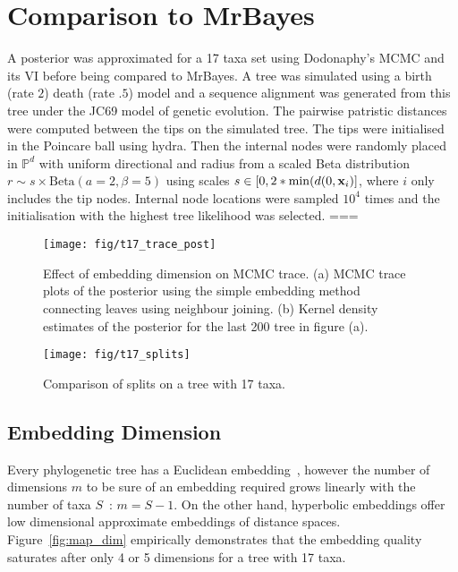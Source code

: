 \documentclass[11pt, twocolumn]{article}
\begin{document}
\section{Comparison to MrBayes}
A posterior was approximated for a 17 taxa set using Dodonaphy's MCMC and its VI before being compared to MrBayes.
A tree was simulated using a birth (rate $2$) death (rate $.5$) model and a sequence alignment was generated from this tree under the JC69 model of genetic evolution.
The pairwise patristic distances were computed between the tips on the simulated tree.
The tips were initialised in the Poincare ball using hydra.
Then the internal nodes were randomly placed in $\mathbb{P}^{d}$ with uniform directional and radius from a scaled Beta distribution $ r \sim s \times \text{Beta}(a=2, \beta=5)$ using scales $s \in [0, 2*\min(d(0, \bold{x}_{i})]$, where $i$ only includes the tip nodes.
Internal node locations were sampled $10^{4}$ times and the initialisation with the highest tree likelihood was selected.
===

\begin{figure}[htbp]
\begin{center}
    \texttt{[image: fig/t17\_trace\_post]}
\end{center}
\caption{Effect of embedding dimension on MCMC trace. (a) MCMC trace plots of the posterior using the simple embedding method connecting leaves using neighbour joining.
(b) Kernel density estimates of the posterior for the last 200 tree in figure (a).}
\end{figure}

\begin{figure}[htbp] \label{fig:splits}
    \begin{center}
        \texttt{[image: fig/t17\_splits]}
    \end{center}
    \caption{Comparison of splits on a tree with 17 taxa.}
    \end{figure}

\subsection{Embedding Dimension}
Every phylogenetic tree has a Euclidean embedding~\cite{devienne2011euclidean}, however the number of dimensions $m$ to be sure of an embedding required grows linearly with the number of taxa $S$~\cite{deza1997geometry}: $m=S-1$.
On the other hand, hyperbolic embeddings offer low dimensional approximate embeddings of distance spaces.
Figure~\ref{fig:map_dim} empirically demonstrates that the embedding quality saturates after only 4 or 5 dimensions for a tree with 17 taxa.
\end{document}
